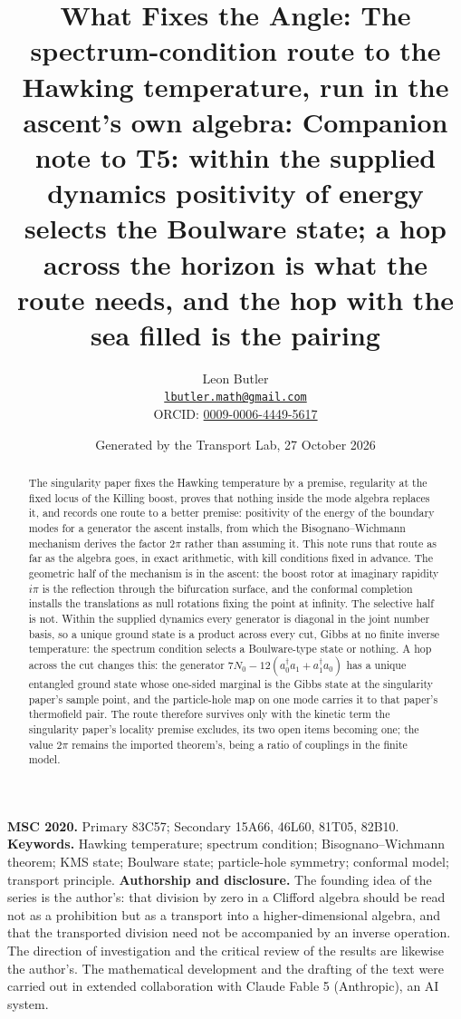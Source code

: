 \documentclass[11pt]{article}
\title{\bfseries What Fixes the Angle: The spectrum-condition route to the Hawking temperature, run in the ascent's own algebra: Companion note to T5: within the supplied dynamics positivity of energy selects the Boulware state; a hop across the horizon is what the route needs, and the hop with the sea filled is the pairing}
\author{Leon Butler\\ \normalsize\href{mailto:lbutler.math@gmail.com}{\texttt{lbutler.math@gmail.com}}\\ \normalsize ORCID: \href{https://orcid.org/0009-0006-4449-5617}{0009-0006-4449-5617}}
\date{Generated by the Transport Lab, 27 October 2026}
\theoremstyle{definition}
\theoremstyle{plain}
\begin{document}
\maketitle
\begin{abstract}
\normalsize
The singularity paper fixes the Hawking temperature by a premise, regularity at the fixed locus of the Killing boost, proves that nothing inside the mode algebra replaces it, and records one route to a better premise: positivity of the energy of the boundary modes for a generator the ascent installs, from which the Bisognano--Wichmann mechanism derives the factor $2\pi$ rather than assuming it. This note runs that route as far as the algebra goes, in exact arithmetic, with kill conditions fixed in advance. The geometric half of the mechanism is in the ascent: the boost rotor at imaginary rapidity $i\pi$ is the reflection through the bifurcation surface, and the conformal completion installs the translations as null rotations fixing the point at infinity. The selective half is not. Within the supplied dynamics every generator is diagonal in the joint number basis, so a unique ground state is a product across every cut, Gibbs at no finite inverse temperature: the spectrum condition selects a Boulware-type state or nothing. A hop across the cut changes this: the generator $7N_{0} - 12(a^{\dagger}_{0}a_{1} + a^{\dagger}_{1}a_{0})$ has a unique entangled ground state whose one-sided marginal is the Gibbs state at the singularity paper's sample point, and the particle-hole map on one mode carries it to that paper's thermofield pair. The route therefore survives only with the kinetic term the singularity paper's locality premise excludes, its two open items becoming one; the value $2\pi$ remains the imported theorem's, being a ratio of couplings in the finite model.
\end{abstract}
\medskip
\noindent\textbf{MSC 2020.} Primary 83C57; Secondary 15A66, 46L60, 81T05, 82B10.\\
\textbf{Keywords.} Hawking temperature; spectrum condition; Bisognano--Wichmann theorem; KMS state; Boulware state; particle-hole symmetry; conformal model; transport principle.
\newpage
\noindent \textbf{Authorship and disclosure. }The founding idea of the series is the author's: that division by zero in a Clifford algebra should be read not as a prohibition but as a transport into a higher-dimensional algebra, and that the transported division need not be accompanied by an inverse operation. The direction of investigation and the critical review of the results are likewise the author's. The mathematical development and the drafting of the text were carried out in extended collaboration with Claude Fable 5 (Anthropic), an AI system.
\end{document}

